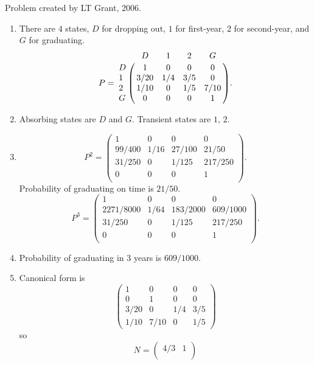 \documentclass[12pt]{article}
\begin{document}
\begin{solution}
    Problem created by LT Grant, 2006.
    \begin{enumerate}[label=(\alph*)]
    \item
        There are \( 4 \) states, \( D \) for dropping out, \( 1 \) for
        first-year, \( 2 \) for second-year, and \( G \) for graduating.
        \[
            P = \bordermatrix{ & D & 1 & 2 & G \cr
            D& 1 & 0 & 0 & 0 \cr
            1& 3/20 & 1/4 & 3/5 & 0 \cr
            2& 1/10 & 0 & 1/5 & 7/10 \cr
            G& 0 & 0 & 0 & 1 }.
        \]
    \item
        Absorbing states are \( D \) and \( G \). Transient states are \(
        1 \), \( 2 \).
    \item
        \[
            P^2 =
            \begin{pmatrix}
                1 & 0 & 0 & 0 \\
                99/400 & 1/16 & 27/100 & 21/50 \\
                31/250 & 0 & 1/125 & 217/250 \\
                0 & 0 & 0 & 1 \\
            \end{pmatrix}
            .
        \] Probability of graduating on time is \( 21/50 \).
        \[
            P^3 =
            \begin{pmatrix}
                1 & 0 & 0 & 0 \\
                2271/8000 & 1/64 & 183/2000 & 609/1000 \\
                31/250 & 0 & 1/125 & 217/250 \\
                0 & 0 & 0 & 1 \\
            \end{pmatrix}
            .
        \]
    \item
        Probability of graduating in \( 3 \) years is \( 609/1000 \).
    \item
        Canonical form is
        \[
            \begin{pmatrix}
                1 & 0 & 0 & 0 \\
                0 & 1 & 0 & 0 \\
                3/20 & 0 & 1/4 & 3/5 \\
                1/10 & 7/10& 0 & 1/5
            \end{pmatrix}
        \] so
        \[
            N =
            \begin{pmatrix}
                4/3 & 1 \\

\end{pmatrix}\]
\end{enumerate}
\end{solution}
\end{document}
